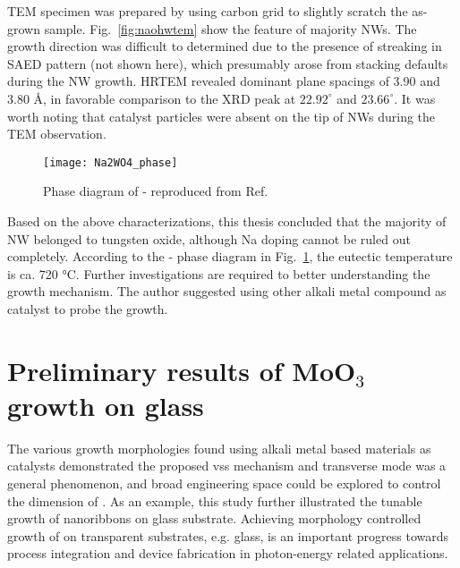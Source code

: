 TEM specimen was prepared by using carbon grid to slightly scratch the as-grown sample. Fig.~\ref{fig:naohwtem} show the feature of majority NWs. The growth direction was difficult to determined due to the presence of streaking in SAED pattern (not shown here), which presumably arose from stacking defaults during the NW growth. HRTEM revealed dominant plane spacings of 3.90 and 3.80 \si{\angstrom}, in favorable comparison to the XRD peak at $22.92^\circ$ and $23.66^\circ$. It was worth noting that catalyst particles were absent on the tip of NWs during the TEM observation. 
\begin{figure}[htb]
\centering
\texttt{[image: Na2WO4\_phase]}
\caption[Phase diagram of -]{Phase diagram of - reproduced from Ref.~\cite{Hoermann1929}}
\label{fig:nawopd}
\end{figure}
Based on the above characterizations, this thesis concluded that the majority of NW belonged to tungsten oxide, although Na doping cannot be ruled out completely. According to the - phase diagram in Fig.~\ref{fig:nawopd}, the eutectic temperature is ca. 720 \si{\degreeCelsius}.\cite{Mann2007} Further investigations are required to better understanding the growth mechanism. The author suggested using other alkali metal compound as catalyst to probe the  growth. 

\section{Preliminary results of MoO$_3$ growth on glass}\label{sec:mogls}

The various growth morphologies found using alkali metal based materials as catalysts demonstrated the proposed \gls{vss} mechanism and transverse mode was a general phenomenon, and broad engineering space could be explored to control the dimension of . As an example, this study further illustrated the tunable growth of  nanoribbons on glass substrate. Achieving morphology controlled growth of  on transparent substrates, e.g. glass, is an important progress towards process integration and device fabrication in photon-energy related applications. 


